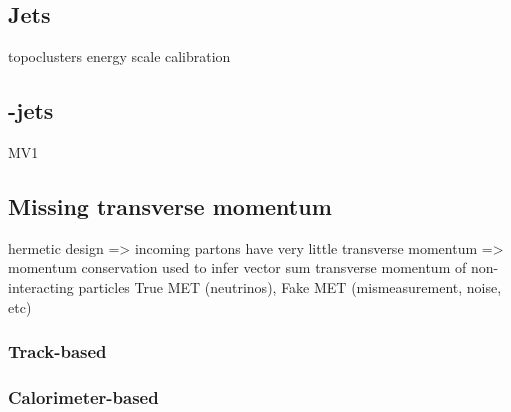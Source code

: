 \subsection{Jets}
\label{sec:objects:jets}

topoclusters
energy scale calibration


\subsection{\Pbottom-jets}
\label{sec:objects:bjets}

MV1


\subsection{Missing transverse momentum}
\label{sec:objects:met}

hermetic design => incoming partons have very little transverse momentum => momentum conservation used to infer vector sum transverse momentum of non-interacting particles
True MET (neutrinos), Fake MET (mismeasurement, noise, etc)

\subsubsection{Track-based \met}

\subsubsection{Calorimeter-based \met}
